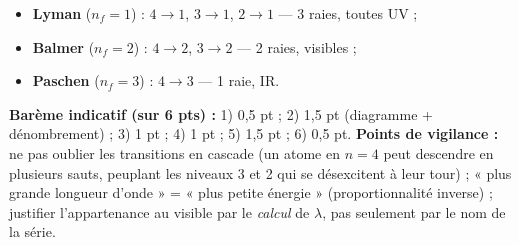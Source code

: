 \documentclass[11pt]{article}
\begin{document}
\begin{corrige}[Exercice 10 — Type Bac : désexcitation depuis le niveau $n = 4$]
\begin{enumerate}
\begin{itemize}
\item \textbf{Lyman} ($n_f = 1$) : $4\to1$, $3\to1$, $2\to1$ — 3 raies, toutes UV ;
\item \textbf{Balmer} ($n_f = 2$) : $4\to2$, $3\to2$ — 2 raies, visibles ;
\item \textbf{Paschen} ($n_f = 3$) : $4\to3$ — 1 raie, IR.
\end{itemize}
\end{enumerate}
\textbf{Barème indicatif (sur 6 pts) :} 1) 0,5 pt ; 2) 1,5 pt (diagramme + dénombrement) ; 3) 1 pt ; 4) 1 pt ; 5) 1,5 pt ; 6) 0,5 pt.
\textbf{Points de vigilance :} ne pas oublier les transitions en cascade (un atome en $n=4$ peut descendre en plusieurs sauts, peuplant les niveaux 3 et 2 qui se désexcitent à leur tour) ; « plus grande longueur d'onde » = « plus petite énergie » (proportionnalité inverse) ; justifier l'appartenance au visible par le \emph{calcul} de $\lambda$, pas seulement par le nom de la série.
\end{corrige}
\end{document}
